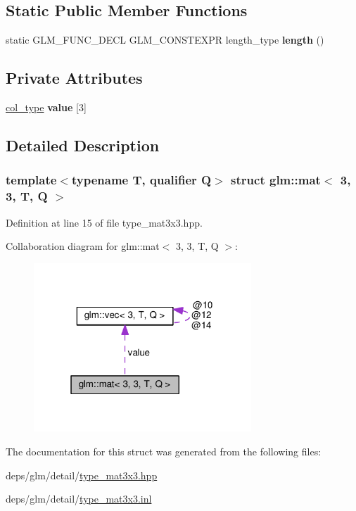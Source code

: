 \subsection*{Static Public Member Functions}
\begin{DoxyCompactItemize}
\item 
\mbox{\label{structglm_1_1mat_3_013_00_013_00_01T_00_01Q_01_4_aa0e0966b5046ab9a88536683a901c589}} 
static G\+L\+M\+\_\+\+F\+U\+N\+C\+\_\+\+D\+E\+CL G\+L\+M\+\_\+\+C\+O\+N\+S\+T\+E\+X\+PR length\+\_\+type {\bfseries length} ()
\end{DoxyCompactItemize}
\subsection*{Private Attributes}
\begin{DoxyCompactItemize}
\item 
\mbox{\label{structglm_1_1mat_3_013_00_013_00_01T_00_01Q_01_4_a505193d8cb434f9d92dafb3108e39452}} 
\hyperlink{structglm_1_1vec_3_013_00_01T_00_01Q_01_4}{col\+\_\+type} {\bfseries value} \mbox{[}3\mbox{]}
\end{DoxyCompactItemize}


\subsection{Detailed Description}
\subsubsection*{template$<$typename T, qualifier Q$>$\newline
struct glm\+::mat$<$ 3, 3, T, Q $>$}



Definition at line 15 of file type\+\_\+mat3x3.\+hpp.



Collaboration diagram for glm\+:\+:mat$<$ 3, 3, T, Q $>$\+:
\nopagebreak
\begin{figure}[H]
\begin{center}
\leavevmode
\includegraphics[width=232pt]{d5/dce/structglm_1_1mat_3_013_00_013_00_01T_00_01Q_01_4__coll__graph}
\end{center}
\end{figure}


The documentation for this struct was generated from the following files\+:\begin{DoxyCompactItemize}
\item 
deps/glm/detail/\hyperlink{type__mat3x3_8hpp}{type\+\_\+mat3x3.\+hpp}\item 
deps/glm/detail/\hyperlink{type__mat3x3_8inl}{type\+\_\+mat3x3.\+inl}\end{DoxyCompactItemize}
